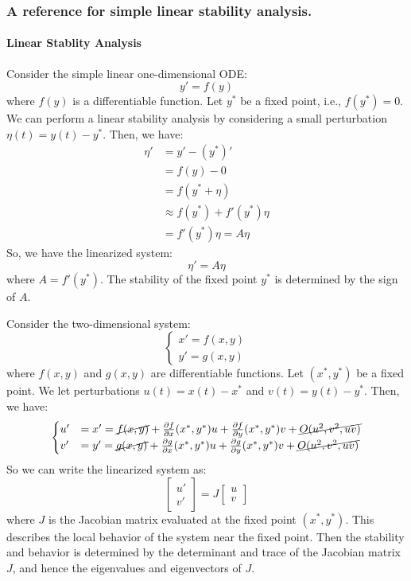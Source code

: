 \documentclass[11pt]{article}
\begin{document}
\begin{shaded}
\subsubsection*{A reference for simple linear stability analysis.}

\paragraph{Linear Stablity Analysis} Consider the simple linear one-dimensional ODE:
$$y' = f(y)$$
where \( f(y) \) is a differentiable function. Let \( y^* \) be a fixed point, i.e., \( f(y^*) = 0 \). We can perform a linear stability analysis by considering a small perturbation \( \eta(t) = y(t) - y^* \). Then, we have:
\begin{align*}
\eta' &= y' - (y^*)' \\
&= f(y) - 0 \\
&= f(y^* + \eta) \\
&\approx f(y^*) + f'(y^*)\eta \\
&= f'(y^*)\eta = A\eta
\end{align*}
So, we have the linearized system:
$$\eta' = A\eta$$
where \( A = f'(y^*) \). The stability of the fixed point \( y^* \) is determined by the sign of \( A \).
\end{shaded}

\begin{definition}
Consider the two-dimensional system:
$$\begin{cases}
x' = f(x, y) \\
y' = g(x, y)
\end{cases}$$
where \( f(x, y) \) and \( g(x, y) \) are differentiable functions. Let \( (x^*, y^*) \) be a fixed point. We let perturbations \( u(t) = x(t) - x^* \) and \( v(t) = y(t) - y^* \). Then, we have:
$$
\begin{cases}
    u' &= x' = \cancel{f(x,y)} + \frac{\partial f}{\partial x}(x^*, y^*)u + \frac{\partial f}{\partial y}(x^*, y^*)v + \cancel{O(u^2, v^2, uv)} \\
    v' &= y' = \cancel{g(x,y)} + \frac{\partial g}{\partial x}(x^*, y^*)u + \frac{\partial g}{\partial y}(x^*, y^*)v + \cancel{O(u^2, v^2, uv)}
\end{cases}
$$
So we can write the linearized system as:
$$\begin{bmatrix}
u' \\ v'
\end{bmatrix} = J \begin{bmatrix}
u \\ v
\end{bmatrix}$$
where \( J \) is the Jacobian matrix evaluated at the fixed point \( (x^*, y^*) \). This describes the local behavior of the system near the fixed point. Then the stability and behavior is determined by the determinant and trace of the Jacobian matrix \( J \), and hence the eigenvalues and eigenvectors of \( J \).
\end{definition}
\end{document}
